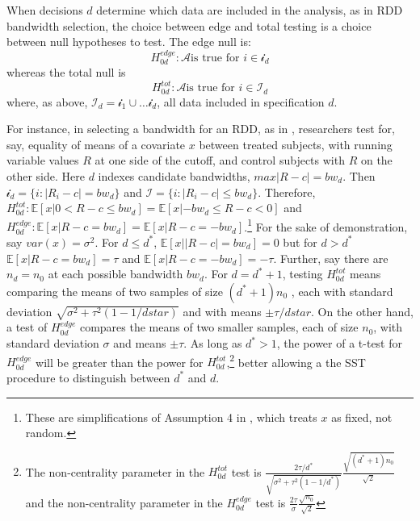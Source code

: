 \documentclass[12pt]{article}\usepackage[]{graphicx}\usepackage[]{color}
\newcommand{\dstar}{d^*}
\newcommand{\hedged}{H_{0d}^{edge}}
\newcommand{\htotd}{H_{0d}^{tot}}
\newcommand{\EE}{\mathbb{E}}
\begin{document}
When decisions $d$ determine which data are included in the analysis,
as in RDD bandwidth selection, the choice between edge and total
testing is a choice between null hypotheses to test.
The edge null is:
\begin{equation}
\hedged: \mathcal{A} \text{is true for } i \in
\mathcal{i}_d
\end{equation}
whereas the total null is
\begin{equation}
\htotd: \mathcal{A} \text{is true for } i \in
\mathcal{I}_d
\end{equation}
where, as above,
$\mathcal{I}_d=\mathcal{i}_1\cup\dots\mathcal{i}_d$, all data
included in specification $d$.

For instance, in selecting a bandwidth for an RDD, as in
\citet{rocio}, researchers test for, say, equality of means of a
covariate $x$ between treated subjects, with running variable values
$R$ at one
side of the cutoff, and control subjects with $R$ on the other side.
Here $d$ indexes candidate bandwidths, $max |R-c|=bw_d$.
Then $\mathcal{i}_d=\{i: |R_i-c|=bw_d\}$ and $\mathcal{I}=\{i:
|R_i-c|\le bw_d\}$.
Therefore, $\htotd : \EE [x| 0<R-c\le bw_d]=\EE [x|-bw_d \le R-c <0]$
and $\hedged :\EE [x|R-c=bw_d]=\EE [x|
R-c=-bw_d]$.\footnote{These are simplifications of Assumption 4 in
  \citet{rocio}, which treats $x$ as fixed, not random.}
For the sake of demonstration, say $var(x)=\sigma^2$.
For $d \le \dstar$, $\EE [x ||R-c|= bw_d]=0$ but for $d>\dstar$
$\EE[x | R-c = bw_d]=\tau$ and $\EE [x|R-c =-bw_d]=-\tau$.
Further, say there are $n_d=n_0$ at each possible bandwidth $bw_d$.
For $d=\dstar+1$, testing $\htotd$ means comparing the means of two
samples of size $(\dstar+1)n_0$ , each with standard deviation
$\sqrt{\sigma^2+\tau^2(1-1/dstar)}$ and with means $\pm \tau/dstar$.
On the other hand, a test of $\hedged$ compares the means of two
smaller samples, each of size $n_0$, with standard deviation $\sigma$
and means $\pm \tau$.
As long as $\dstar>1$, the power of a t-test for $\hedged$ will be greater
than the power for $\htotd$,\footnote{The non-centrality parameter in
  the $\htotd$ test is
  $\frac{2\tau/\dstar}{\sqrt{\sigma^2+\tau^2(1-1/\dstar)}}\frac{\sqrt{(\dstar+1)n_0}}{\sqrt{2}}$
    and the non-centrality parameter in the $\hedged$ test is
    $\frac{2\tau}{\sigma}\frac{\sqrt{n_0}}{\sqrt{2}}$}
better allowing a the SST procedure to distinguish between $\dstar$
and $d$.
\end{document}
